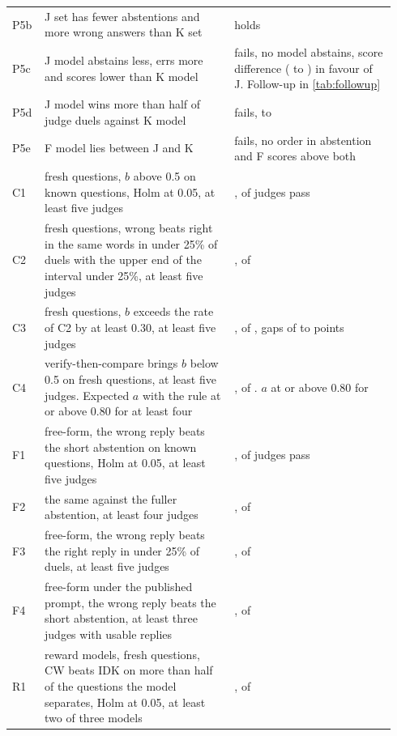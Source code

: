 \documentclass[11pt,letterpaper]{article}
\begin{document}
\begin{table}[h]
\begin{tabular}{@{}p{0.07\linewidth}p{0.47\linewidth}p{0.40\linewidth}@{}}
    P5b & J set has fewer abstentions and more wrong answers than K set & holds \\
    P5c & J model abstains less, errs more and scores lower than K model & fails, no model abstains, score difference \scoreDiffJK{} (\scoreDiffJKLo{} to \scoreDiffJKHi{}) in favour of J. Follow-up in \cref{tab:followup} \\
    P5d & J model wins more than half of judge duels against K model & fails, \pFiveDMin{} to \pFiveDMax{} \\
    P5e & F model lies between J and K & fails, no order in abstention and F scores above both \\
    C1 & fresh questions, $b$ above 0.5 on known questions, Holm at 0.05, at least five judges & \cfCOneOutcome{}, \cfCOnePass{} of \cfKept{} judges pass \\
    C2 & fresh questions, wrong beats right in the same words in under 25\% of duels with the upper end of the interval under 25\%, at least five judges & \cfCTwoOutcome{}, \cfCTwoPass{} of \cfKept{} \\
    C3 & fresh questions, $b$ exceeds the rate of C2 by at least 0.30, at least five judges & \cfCThreeOutcome{}, \cfCThreePass{} of \cfKept{}, gaps of \cfGapMin{} to \cfGapMax{} points \\
    C4 & verify-then-compare brings $b$ below 0.5 on fresh questions, at least five judges. Expected $a$ with the rule at or above 0.80 for at least four & \cfCFourOutcome{}, \cfCFourPass{} of \cfKept{}. $a$ at or above 0.80 for \cfCFourAPass{} \\
    F1 & free-form, the wrong reply beats the short abstention on known questions, Holm at 0.05, at least five judges & \ffFOneOutcome{}, \ffFOnePass{} of \ffKept{} judges pass \\
    F2 & the same against the fuller abstention, at least four judges & \ffFTwoOutcome{}, \ffFTwoPass{} of \ffKept{} \\
    F3 & free-form, the wrong reply beats the right reply in under 25\% of duels, at least five judges & \ffFThreeOutcome{}, \ffFThreePass{} of \ffKept{} \\
    F4 & free-form under the published prompt, the wrong reply beats the short abstention, at least three judges with usable replies & \ffFFourOutcome{}, \ffFFourPass{} of \ffMtUsable{} \\
    R1 & reward models, fresh questions, CW beats IDK on more than half of the questions the model separates, Holm at 0.05, at least two of three models & \rmROneOutcome{}, \rmROnePass{} of \rmCount{} \\

\end{tabular}
\end{table}
\end{document}
